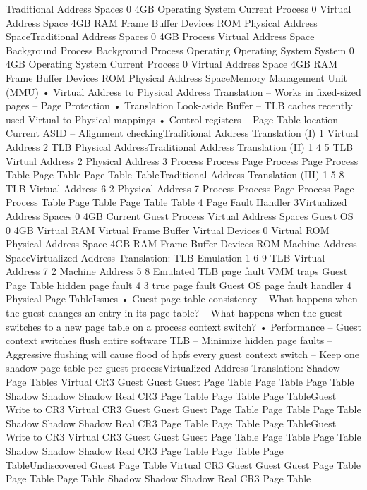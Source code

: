 \documentclass[10pt]{article}
\begin{document}
Traditional Address Spaces
0
4GB
Operating
System
Current Process
0
Virtual
Address Space
4GB
RAM
Frame
Buffer
Devices
ROM
Physical
Address SpaceTraditional Address Spaces
0
4GB
Process Virtual Address Space
Background Process
Background Process
Operating
Operating
System
System
0
4GB
Operating
System
Current Process
0
Virtual
Address Space
4GB
RAM
Frame
Buffer
Devices
ROM
Physical
Address SpaceMemory Management Unit (MMU)
•  Virtual Address to Physical Address
Translation
–  Works in fixed-sized pages
–  Page Protection
•  Translation Look-aside Buffer
–  TLB caches recently used Virtual to Physical
mappings
•  Control registers
–  Page Table location
–  Current ASID
–  Alignment checkingTraditional Address Translation (I)
1
Virtual Address
2
TLB
Physical AddressTraditional Address Translation (II)
1
4
5
TLB
Virtual Address
2
Physical Address
3
Process
Process
Page
Process
Page
Process
Table
Page
Table
Page
Table
TableTraditional Address Translation (III)
1
5
8
TLB
Virtual Address
6
2
Physical Address
7
Process
Process
Page
Process
Page
Process
Table
Page
Table
Page
Table
Table
4
Page
Fault
Handler
3Virtualized Address Spaces
0
4GB
Current Guest Process
Virtual
Address Spaces
Guest OS
0
4GB
Virtual RAM
Virtual
Frame
Buffer
Virtual
Devices
0
Virtual
ROM
Physical
Address Space
4GB
RAM
Frame
Buffer
Devices
ROM
Machine
Address SpaceVirtualized Address Translation:
TLB Emulation
1
6
9
TLB
Virtual Address
7
2
Machine Address
5
8
Emulated
TLB
page
fault
VMM
traps
Guest
Page
Table
hidden
page
fault
4
3
true
page
fault
Guest OS
page fault
handler
4
Physical
Page
TableIssues
•  Guest page table consistency
–  What happens when the guest changes an entry
in its page table?
–  What happens when the guest switches to a new
page table on a process context switch?
•  Performance
–  Guest context switches flush entire software TLB
–  Minimize hidden page faults
–  Aggressive flushing will cause flood of hpfs every
guest context switch
–  Keep one shadow page table per guest processVirtualized Address Translation:
Shadow Page Tables
Virtual
CR3
Guest
Guest
Guest
Page Table Page Table Page Table
Shadow Shadow Shadow
Real CR3
Page Table
Page Table
Page TableGuest Write to CR3
Virtual
CR3
Guest
Guest
Guest
Page Table Page Table Page Table
Shadow Shadow Shadow
Real CR3
Page Table
Page Table
Page TableGuest Write to CR3
Virtual
CR3
Guest
Guest
Guest
Page Table Page Table Page Table
Shadow Shadow Shadow
Real CR3
Page Table
Page Table
Page TableUndiscovered Guest Page Table
Virtual
CR3
Guest
Guest
Guest
Page Table Page Table Page Table
Shadow Shadow Shadow
Real CR3
Page Table
\end{document}
